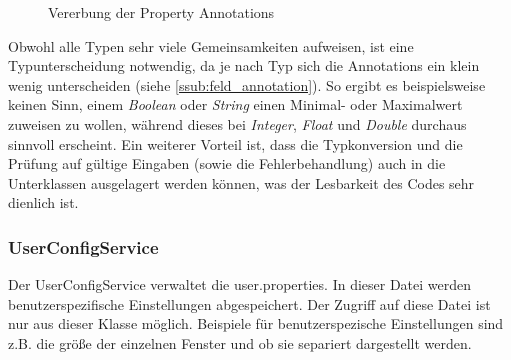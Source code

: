 \documentclass[a4paper, 11pt]{article} %
\begin{document}
\begin{figure}[!htp]
\caption{Vererbung der Property Annotations}
\label{fig:field_annotation}
\end{figure}

 Obwohl alle Typen sehr viele Gemeinsamkeiten aufweisen, ist eine Typunterscheidung notwendig, da je nach Typ sich die Annotations ein klein wenig unterscheiden (siehe \ref{ssub:feld_annotation}). So ergibt es beispielsweise keinen Sinn, einem \emph{Boolean} oder \emph{String} einen Minimal- oder Maximalwert zuweisen zu wollen, während dieses bei \emph{Integer}, \emph{Float} und \emph{Double} durchaus sinnvoll erscheint. Ein weiterer Vorteil ist, dass die Typkonversion und die Prüfung auf gültige Eingaben (sowie die Fehlerbehandlung) auch in die Unterklassen ausgelagert werden können, was der Lesbarkeit des Codes sehr dienlich ist. 

\subsubsection{UserConfigService} %
\label{ssub:userconfigservice}
Der UserConfigService verwaltet die user.properties. In dieser Datei werden benutzerspezifische Einstellungen abgespeichert. Der Zugriff auf diese Datei ist nur aus dieser Klasse möglich. Beispiele für benutzerspezische Einstellungen sind z.B. die größe der einzelnen Fenster und ob sie separiert dargestellt werden.
\end{document}
